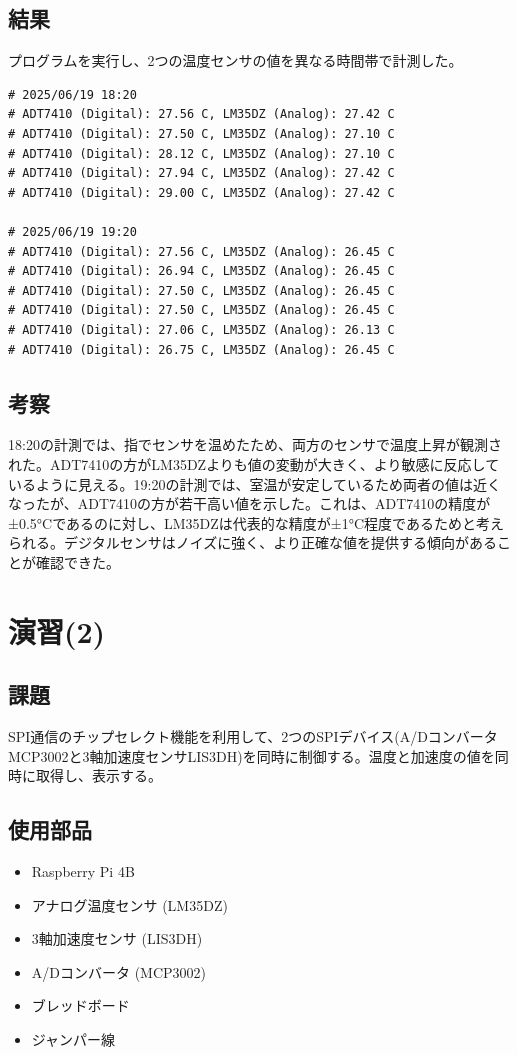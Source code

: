 \documentclass[a4paper,11pt,dvipdfmx]{jsarticle}
\begin{document}
\subsection{結果}
プログラムを実行し、2つの温度センサの値を異なる時間帯で計測した。
\begin{verbatim}
# 2025/06/19 18:20
# ADT7410 (Digital): 27.56 C, LM35DZ (Analog): 27.42 C
# ADT7410 (Digital): 27.50 C, LM35DZ (Analog): 27.10 C
# ADT7410 (Digital): 28.12 C, LM35DZ (Analog): 27.10 C
# ADT7410 (Digital): 27.94 C, LM35DZ (Analog): 27.42 C
# ADT7410 (Digital): 29.00 C, LM35DZ (Analog): 27.42 C

# 2025/06/19 19:20
# ADT7410 (Digital): 27.56 C, LM35DZ (Analog): 26.45 C
# ADT7410 (Digital): 26.94 C, LM35DZ (Analog): 26.45 C
# ADT7410 (Digital): 27.50 C, LM35DZ (Analog): 26.45 C
# ADT7410 (Digital): 27.50 C, LM35DZ (Analog): 26.45 C
# ADT7410 (Digital): 27.06 C, LM35DZ (Analog): 26.13 C
# ADT7410 (Digital): 26.75 C, LM35DZ (Analog): 26.45 C
\end{verbatim}

\subsection{考察}
18:20の計測では、指でセンサを温めたため、両方のセンサで温度上昇が観測された。ADT7410の方がLM35DZよりも値の変動が大きく、より敏感に反応しているように見える。19:20の計測では、室温が安定しているため両者の値は近くなったが、ADT7410の方が若干高い値を示した。これは、ADT7410の精度が±0.5°Cであるのに対し、LM35DZは代表的な精度が±1°C程度であるためと考えられる。デジタルセンサはノイズに強く、より正確な値を提供する傾向があることが確認できた。

\section{演習(2)}
\subsection{課題}
SPI通信のチップセレクト機能を利用して、2つのSPIデバイス(A/DコンバータMCP3002と3軸加速度センサLIS3DH)を同時に制御する。温度と加速度の値を同時に取得し、表示する。

\subsection{使用部品}
\begin{itemize}
    \item Raspberry Pi 4B
    \item アナログ温度センサ (LM35DZ)
    \item 3軸加速度センサ (LIS3DH)
    \item A/Dコンバータ (MCP3002)
    \item ブレッドボード
    \item ジャンパー線
\end{itemize}
\end{document}
